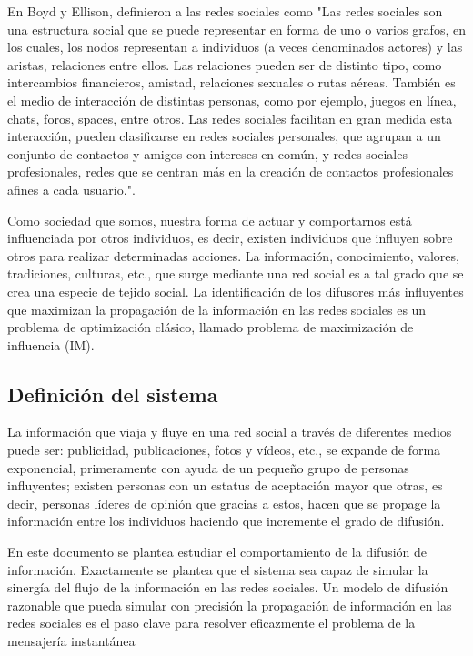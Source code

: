 \documentclass{article}
\begin{document}
 En Boyd y Ellison, definieron a las redes sociales como "Las redes sociales son una estructura social que se puede representar en forma de uno o varios grafos, en los cuales, los nodos representan a individuos (a veces denominados actores) y las aristas, relaciones entre ellos. Las relaciones pueden ser de distinto tipo, como intercambios financieros, amistad, relaciones sexuales o rutas aéreas. También es el medio de interacción de distintas personas, como por ejemplo, juegos en línea, chats, foros, spaces, entre otros. Las redes sociales facilitan en gran medida esta interacción, pueden clasificarse en redes sociales personales, que agrupan a un conjunto de contactos y amigos con intereses en común, y redes sociales profesionales, redes que se centran más en la creación de contactos profesionales afines a cada usuario."\cite{definition:redsocial}. 
 
 Como sociedad que somos, nuestra forma de actuar y comportarnos está influenciada por otros individuos, es decir, existen individuos que influyen sobre otros para realizar determinadas acciones. La información, conocimiento, valores, tradiciones, culturas, etc., que surge mediante una red social es a tal grado que se crea una especie de tejido social. La identificación de los difusores más influyentes que maximizan la propagación de la información en las redes sociales es un problema de optimización clásico, llamado problema de maximización de influencia (IM).
   
 \subsection{Definición del sistema}
La información que viaja y fluye en una red social a través de diferentes medios puede ser: publicidad, publicaciones, fotos y vídeos, etc., se expande de forma exponencial, primeramente con ayuda de un pequeño grupo de personas influyentes; existen personas con un estatus de aceptación mayor que otras, es decir, personas líderes de opinión que gracias a estos, hacen que se propage la información entre los individuos haciendo que incremente el grado de difusión.

En este documento se plantea estudiar el comportamiento de la difusión de información. Exactamente se plantea que el sistema sea capaz de simular la sinergía del flujo de la información en las redes sociales. Un modelo de difusión razonable que pueda simular con precisión la propagación de información en las redes sociales es el paso clave para resolver eficazmente el problema de la mensajería instantánea
 
\end{document}
